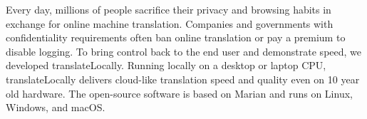 Every day, millions of people sacrifice their privacy and browsing habits in exchange for online machine translation.  Companies and governments with confidentiality requirements often ban online translation or pay a premium to disable logging.  To bring control back to the end user and demonstrate speed, we developed translateLocally.  Running locally on a desktop or laptop CPU, translateLocally delivers cloud-like translation speed and quality even on 10 year old hardware.  The open-source software is based on Marian and runs on Linux, Windows, and macOS.